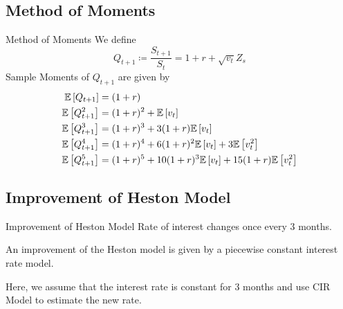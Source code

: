 \subsection{Method of Moments}
\begin{frame}{Method of Moments}
	We define
	\[ Q_{t+1} \coloneqq \frac{S_{t+1}}{S_t} = 1 + r + \sqrt{v_t} Z_s \]
	Sample Moments of \( Q_{t+1} \) are given by
	\begin{align*}
		\mathbb{E} \left[ Q_{t+1} \right] &= (1+r) \\
		\mathbb{E} \left[ Q_{t+1}^2 \right] &= (1+r)^2 + \mathbb{E} \left[ v_t \right] \\
		\mathbb{E} \left[ Q_{t+1}^3 \right] &= (1+r)^3 + 3(1+r)\mathbb{E} \left[ v_t \right] \\
		\mathbb{E} \left[ Q_{t+1}^4 \right] &= (1+r)^4 + 6(1+r)^2 \mathbb{E} \left[ v_t \right] + 3\mathbb{E} \left[ v_t^2 \right] \\
		\mathbb{E} \left[ Q_{t+1}^5 \right] &= (1+r)^5 + 10(1+r)^3 \mathbb{E} \left[ v_t \right] +
			15(1+r)\mathbb{E} \left[ v_t^2 \right] \\
	\end{align*}
\end{frame}

\subsection{Improvement of Heston Model}
\begin{frame}{Improvement of Heston Model}
	Rate of interest changes once every 3 months.
	\vspace{0.5cm}

	An improvement of the Heston model is given by
	a piecewise constant interest rate model.
	\vspace{0.5cm}

	Here, we assume that the interest rate is constant
	for 3 months and use CIR Model to estimate the new rate.
\end{frame}